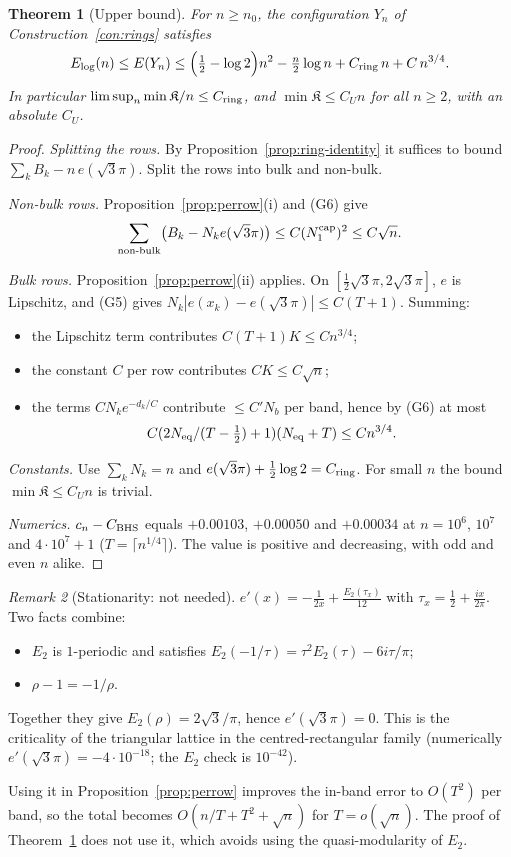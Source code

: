 \documentclass[11pt]{article}
\newtheorem{theorem}{Theorem}[section]
\theoremstyle{definition}
\theoremstyle{remark}
\newtheorem{remark}[theorem]{Remark}
\begin{document}
\begin{theorem}[Upper bound]\label{thm:UB}
For $n\ge n_0$, the configuration $Y_n$ of Construction~\ref{con:rings} satisfies
\[
E_{\log}(n)\le E(Y_n)\le\Bigl(\tfrac12-\log2\Bigr)n^2-\tfrac n2\log n+C_{\rm ring}\,n+C\,n^{3/4} .
\]
In particular $\limsup_n\min\mathfrak K/n\le C_{\rm ring}$, and $\min\mathfrak K\le C_Un$ for
all $n\ge2$, with an absolute $C_U$.
\end{theorem}
\begin{proof}
\emph{Splitting the rows.} By Proposition~\ref{prop:ring-identity} it suffices to bound
$\sum_kB_k-n\,e(\sqrt3\pi)$. Split the rows into bulk and non-bulk.

\emph{Non-bulk rows.} Proposition~\ref{prop:perrow}(i) and (G6) give
\[
\sum_{\text{non-bulk}}\bigl(B_k-N_ke(\sqrt3\pi)\bigr)\le C(N_1^{\rm cap})^2\le C\sqrt n .
\]

\emph{Bulk rows.} Proposition~\ref{prop:perrow}(ii) applies. On
$[\tfrac12\sqrt3\pi,2\sqrt3\pi]$, $e$ is Lipschitz, and (G5) gives
$N_k|e(x_k)-e(\sqrt3\pi)|\le C(T+1)$. Summing:
\begin{itemize}[leftmargin=*]
\item the Lipschitz term contributes $C(T+1)K\le Cn^{3/4}$;
\item the constant $C$ per row contributes $CK\le C\sqrt n$;
\item the terms $CN_ke^{-d_k/C}$ contribute $\le C'N_b$ per band, hence by (G6) at most
  \[
  C(2N_{\rm eq}/(T-\tfrac12)+1)(N_{\rm eq}+T)\le Cn^{3/4}.
  \]
\end{itemize}

\emph{Constants.} Use $\sum_kN_k=n$ and $e(\sqrt3\pi)+\tfrac12\log2=C_{\rm ring}$. For small $n$
the bound $\min\mathfrak K\le C_Un$ is trivial.

\emph{Numerics.} $c_n-C_{\rm BHS}$ equals $+0.00103$, $+0.00050$ and $+0.00034$ at
$n=10^6$, $10^7$ and $4\cdot10^7+1$ ($T=\lceil n^{1/4}\rceil$).
The value is positive and decreasing, with odd and even $n$ alike.
\end{proof}

\begin{remark}[Stationarity: not needed]\label{rem:stationarity}
$e'(x)=-\frac1{2x}+\frac{E_2(\tau_x)}{12}$ with $\tau_x=\tfrac12+\tfrac{ix}{2\pi}$. Two facts
combine:
\begin{itemize}[leftmargin=*]
\item $E_2$ is $1$-periodic and satisfies $E_2(-1/\tau)=\tau^2E_2(\tau)-6i\tau/\pi$;
\item $\rho-1=-1/\rho$.
\end{itemize}
Together they give $E_2(\rho)=2\sqrt3/\pi$, hence $e'(\sqrt3\pi)=0$. This is the criticality of
the triangular lattice in the centred-rectangular family (numerically $e'(\sqrt3\pi)=-4\cdot10^{-18}$;
the $E_2$ check is $10^{-42}$).

Using it in Proposition~\ref{prop:perrow} improves the in-band error to $O(T^2)$ per band, so the
total becomes $O(n/T+T^2+\sqrt n)$ for $T=o(\sqrt n)$. The proof of Theorem~\ref{thm:UB} does not
use it, which avoids using the quasi-modularity of $E_2$.
\end{remark}
\end{document}
